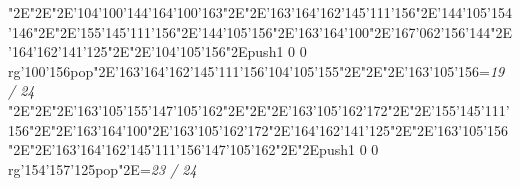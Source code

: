 \null\vfill\enskip\enskip\enskip\ipa\char"2E\enskip\enskip\enskip\ipa\char"2E\enskip\ipa\char"2E\ipa\char'104\ipa\char'100\ipa\char'144\bigskip\ipa\char'164\ipa\char'100\ipa\char'163\ipa\char"2E\enskip\enskip\enskip\ipa\char"2E\ipa\char'163\ipa\char'164\ipa\char'162\ipa\char'145\ipa\char'111\ipa\char'156\bigskip\enskip\enskip\ipa\char"2E\ipa\char'144\ipa\char'105\ipa\char'154\ipa\char'146\ipa\char"2E\enskip\ipa\char"2E\ipa\char'155\ipa\char'145\ipa\char'111\ipa\char'156\ipa\char"2E\ipa\char'144\ipa\char'105\ipa\char'156\ipa\char"2E\ipa\char'163\ipa\char'164\ipa\char'100\ipa\char"2E\ipa\char'167\ipa\char'062\ipa\char'156\ipa\char'144\bigskip\enskip\ipa\char"2E\ipa\char'164\ipa\char'162\ipa\char'141\ipa\char'125\ipa\char"2E\enskip\enskip\ipa\char"2E\ipa\char'104\ipa\char'105\ipa\char'156\ipa\char"2E\pdfcolorstack\match push{1 0 0 rg}\ipa\char'100\ipa\char'156\pdfcolorstack\match pop{}\ipa\char"2E\ipa\char'163\ipa\char'164\ipa\char'162\ipa\char'145\ipa\char'111\ipa\char'156\bigskip\ipa\char'104\ipa\char'105\ipa\char'155\ipa\char"2E\enskip\enskip\ipa\char"2E\enskip\enskip\enskip\ipa\char"2E\ipa\char'163\ipa\char'105\ipa\char'156\bigskip\vfill\footline={\hfill\tenrm\it 19 / 24}\eject
\null\vfill\enskip\enskip\enskip\ipa\char"2E\enskip\enskip\enskip\ipa\char"2E\enskip\ipa\char"2E\ipa\char'163\ipa\char'105\ipa\char'155\bigskip\ipa\char'147\ipa\char'105\ipa\char'162\ipa\char"2E\enskip\enskip\enskip\ipa\char"2E\enskip\enskip\enskip\enskip\enskip\enskip\bigskip\enskip\enskip\ipa\char"2E\ipa\char'163\ipa\char'105\ipa\char'162\ipa\char'172\ipa\char"2E\enskip\ipa\char"2E\ipa\char'155\ipa\char'145\ipa\char'111\ipa\char'156\ipa\char"2E\enskip\enskip\enskip\ipa\char"2E\ipa\char'163\ipa\char'164\ipa\char'100\ipa\char"2E\ipa\char'163\ipa\char'105\ipa\char'162\ipa\char'172\bigskip\enskip\ipa\char"2E\ipa\char'164\ipa\char'162\ipa\char'141\ipa\char'125\ipa\char"2E\enskip\enskip\ipa\char"2E\ipa\char'163\ipa\char'105\ipa\char'156\ipa\char"2E\enskip\enskip\ipa\char"2E\ipa\char'163\ipa\char'164\ipa\char'162\ipa\char'145\ipa\char'111\ipa\char'156\bigskip\ipa\char'147\ipa\char'105\ipa\char'162\ipa\char"2E\enskip\enskip\ipa\char"2E\pdfcolorstack\match push{1 0 0 rg}\ipa\char'154\ipa\char'157\ipa\char'125\pdfcolorstack\match pop{}\ipa\char"2E\enskip\enskip\enskip\bigskip\vfill\footline={\hfill\tenrm\it 23 / 24}\eject
